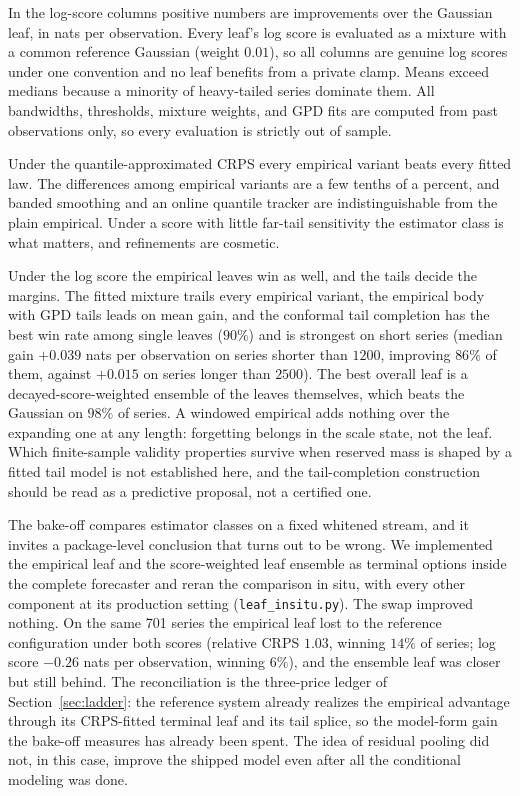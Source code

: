 \documentclass[11pt]{article}
\theoremstyle{remark}
\begin{document}
In the log-score columns positive numbers are improvements over the Gaussian leaf, in nats
per observation. Every leaf's log score is evaluated as a mixture with a common reference
Gaussian (weight $0.01$), so all columns are genuine log scores under one convention and no
leaf benefits from a private clamp. Means exceed medians because a minority of heavy-tailed
series dominate them. All bandwidths, thresholds, mixture weights, and GPD
fits are computed from past observations only, so every evaluation is strictly out of sample.

Under the quantile-approximated CRPS every empirical variant beats every fitted law. The
differences among empirical variants are a few tenths of a percent, and banded smoothing and
an online quantile tracker are indistinguishable from the plain empirical. Under a score with
little far-tail sensitivity the estimator class is what matters, and refinements are
cosmetic.

Under the log score the empirical leaves win as well, and the tails decide the margins. The
fitted mixture trails every empirical variant, the empirical body with GPD tails leads on
mean gain, and the conformal tail completion has the best win rate among single leaves
($90\%$) and is strongest on short series (median gain $+0.039$ nats per observation on
series shorter than $1200$, improving $86\%$ of them, against $+0.015$ on series longer than
$2500$). The best overall leaf is a decayed-score-weighted ensemble of the leaves themselves,
which beats the Gaussian on $98\%$ of series. A windowed empirical adds nothing over the
expanding one at any length: forgetting belongs in the scale state, not the leaf. Which finite-sample
validity properties survive when reserved mass is shaped by a fitted tail model is not
established here, and the tail-completion construction should be read as a predictive
proposal, not a certified one.

The bake-off compares estimator classes on a fixed whitened stream, and it invites a
package-level conclusion that turns out to be wrong. We implemented the empirical leaf and
the score-weighted leaf ensemble as terminal options inside the complete forecaster and
reran the comparison in situ, with every other component at its production setting
(\texttt{leaf\_insitu.py}). The swap improved nothing. On the same 701 series the
empirical leaf lost to the reference configuration under both scores (relative CRPS $1.03$,
winning $14\%$ of series; log score $-0.26$ nats per observation, winning $6\%$), and the
ensemble leaf was closer but still behind. The reconciliation is the three-price ledger of
Section~\ref{sec:ladder}: the reference system already realizes the empirical advantage
through its CRPS-fitted terminal leaf and its tail splice, so the model-form gain the
bake-off measures has already been spent. The idea of residual pooling did not, in this case,
improve the shipped model even after all the conditional modeling was done.
\end{document}
